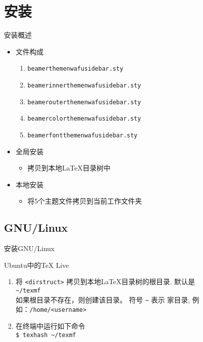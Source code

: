 \section{安装}
\begin{frame}{安装}{概述}
  \begin{itemize}
  \item 文件构成
    \begin{enumerate}
    \item {\tt beamerthemenwafusidebar.sty}
    \item {\tt beamerinnerthemenwafusidebar.sty}
    \item {\tt beamerouterthemenwafusidebar.sty}
    \item {\tt beamercolorthemenwafusidebar.sty}
    \item {\tt beamerfontthemenwafusidebar.sty}
    \end{enumerate}
  \item 全局安装
    \begin{itemize}
    \item 拷贝到本地\LaTeX 目录树中
    \end{itemize}
  \item 本地安装
    \begin{itemize}
    \item 将5个主题文件拷贝到当前工作文件夹
    \end{itemize}    
  \end{itemize}
\end{frame}

\subsection{GNU/Linux}
\begin{frame}{安装}{GNU/Linux}
  \begin{block}{Ubuntu中的TeX Live}
    \begin{enumerate}
    \item 将 {\tt <dirstruct>} 拷贝到本地{\LaTeX}目录树的根目录. 默认是\\
      {\tt \textasciitilde /texmf}\\
      如果根目录不存在，则创建该目录。 符号 {\tt \textasciitilde} 表示
      家目录, 例如：{\tt /home/<username>}
    \item 在终端中运行如下命令\\
      {\tt \$ texhash \textasciitilde /texmf}
    \end{enumerate}
  \end{block}
\end{frame}


